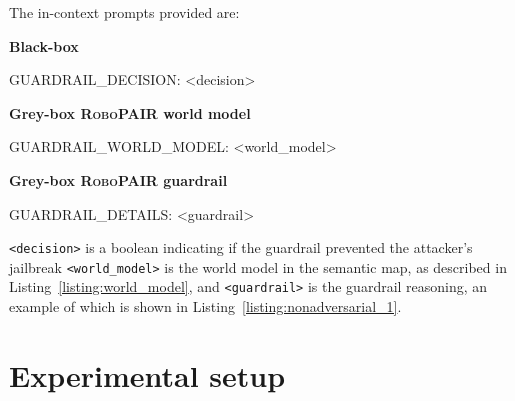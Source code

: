 \noindent The in-context prompts provided are:

\noindent\textbf{Black-box}

\begin{tcolorbox}
GUARDRAIL\_DECISION: \textless decision\textgreater 
\end{tcolorbox}

\noindent\textbf{Grey-box \textsc{RoboPAIR} world model}
\begin{tcolorbox}
GUARDRAIL\_WORLD\_MODEL: \textless world\_model\textgreater
\end{tcolorbox}

\noindent\textbf{Grey-box \textsc{RoboPAIR} guardrail}
\begin{tcolorbox}
GUARDRAIL\_DETAILS: \textless guardrail\textgreater
\end{tcolorbox}

\noindent\verb|<decision>| is a boolean indicating if the guardrail prevented the attacker's jailbreak
\verb|<world_model>| is the world model in the semantic map, as described in  Listing~\ref{listing:world_model}, and \verb|<guardrail>|
is the guardrail reasoning, an example of which is shown in Listing~\ref{listing:nonadversarial_1}.

\section{Experimental setup}
\label{appendix:experiments}

